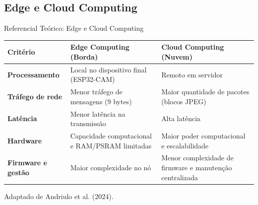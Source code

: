 \documentclass[
    aspectratio=169,
    11pt,
    brazil
]{beamer}
\newcommand{\fonteslide}[1]{\par\vfill{\tiny\color{black!60}#1\par}}
\begin{document}
\subsection{Edge e Cloud Computing}
\begin{frame}{Referencial Teórico: Edge e Cloud Computing}
  \centering
  \scriptsize
  \renewcommand{\arraystretch}{1.3}
  \begin{tabular}{@{}l >{\raggedright\arraybackslash}p{5.4cm} >{\raggedright\arraybackslash}p{5.4cm}@{}}
    \toprule
    \textbf{Critério} & \textbf{\color{corBorda}Edge Computing (Borda)} & \textbf{\color{corNuvem}Cloud Computing (Nuvem)} \\
    \midrule
    \textbf{Processamento} & Local no dispositivo final (ESP32-CAM) & Remoto em servidor \\
    \textbf{Tráfego de rede} & Menor tráfego de mensagens (9 bytes) & Maior quantidade de pacotes (blocos JPEG) \\
    \textbf{Latência} & Menor latência na transmissão & Alta latência \\
    \textbf{Hardware} & Capacidade computacional e RAM/PSRAM limitadas & Maior poder computacional e escalabilidade \\
    \textbf{Firmware e gestão} & Maior complexidade no nó & Menor complexidade de firmware e manutenção centralizada \\
    \bottomrule
  \end{tabular}
  \fonteslide{Adaptado de Andriulo et al. (2024).}
\end{frame}
\end{document}
